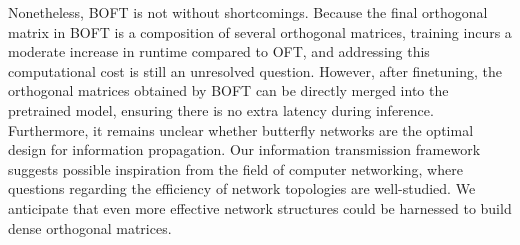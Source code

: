 Nonetheless, BOFT is not without shortcomings. Because the final orthogonal matrix in BOFT is a composition of several orthogonal matrices, training incurs a moderate increase in runtime compared to OFT, and addressing this computational cost is still an unresolved question. However, after finetuning, the orthogonal matrices obtained by BOFT can be directly merged into the pretrained model, ensuring there is no extra latency during inference. Furthermore, it remains unclear whether butterfly networks are the optimal design for information propagation. Our information transmission framework suggests possible inspiration from the field of computer networking, where questions regarding the efficiency of network topologies are well-studied. We anticipate that even more effective network structures could be harnessed to build dense orthogonal matrices.

